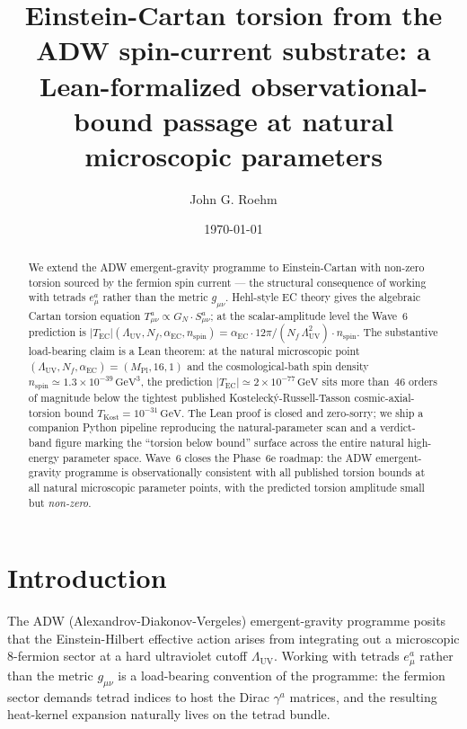 \documentclass[twocolumn]{revtex4-2}
\newcommand{\Nf}{N_f}
\newcommand{\LambdaUV}{\Lambda_{\mathrm{UV}}}
\newcommand{\MPl}{M_{\mathrm{Pl}}}
\newcommand{\aEC}{\alpha_{\mathrm{EC}}}
\newcommand{\GN}{G_{N}}
\newcommand{\TEC}{T_{\mathrm{EC}}}
\newcommand{\nspin}{n_{\mathrm{spin}}}
\newcommand{\TKost}{T_{\mathrm{Kost}}}
\begin{document}
\title{Einstein-Cartan torsion from the ADW spin-current substrate:
  a Lean-formalized observational-bound passage at natural microscopic
  parameters}

\author{John G. Roehm}

\date{\today}

\begin{abstract}
We extend the ADW emergent-gravity programme to Einstein-Cartan with
non-zero torsion sourced by the fermion spin current --- the
structural consequence of working with tetrads $e^{a}_{\mu}$ rather
than the metric $g_{\mu\nu}$. Hehl-style EC theory gives the algebraic
Cartan torsion equation $T^{a}_{\mu\nu} \propto \GN\cdot S^{a}_{\mu\nu}$;
at the scalar-amplitude level the Wave~6 prediction is
$|\TEC|(\LambdaUV,\Nf,\aEC,\nspin)
   = \aEC\cdot 12\pi/(\Nf\,\LambdaUV^{2})\cdot\nspin$.
The substantive load-bearing claim is a Lean theorem: at the natural
microscopic point $(\LambdaUV,\Nf,\aEC) = (\MPl,16,1)$ and the
cosmological-bath spin density $\nspin \simeq 1.3\times 10^{-39}\,
\mathrm{GeV}^{3}$, the prediction $|\TEC| \simeq 2\times 10^{-77}\,
\mathrm{GeV}$ sits more than~46 orders of magnitude below the
tightest published Kostelecký-Russell-Tasson cosmic-axial-torsion
bound $\TKost = 10^{-31}\,\mathrm{GeV}$. The Lean proof is closed and
zero-sorry; we ship a companion Python pipeline reproducing the
natural-parameter scan and a verdict-band figure marking the
``torsion below bound'' surface across the entire natural high-energy
parameter space. Wave~6 closes the Phase~6e roadmap: the ADW
emergent-gravity programme is observationally consistent with all
published torsion bounds at all natural microscopic parameter points,
with the predicted torsion amplitude small but \emph{non-zero}.
\end{abstract}

\maketitle

\section{Introduction}

The ADW (Alexandrov-Diakonov-Vergeles) emergent-gravity programme
\cite{Sakharov1968,Adler1982,Diakonov2011,VladimirovDiakonov2012,Vergeles2025}
posits that the Einstein-Hilbert effective action arises from
integrating out a microscopic 8-fermion sector at a hard ultraviolet
cutoff $\LambdaUV$. Working with tetrads $e^{a}_{\mu}$ rather than the
metric $g_{\mu\nu}$ is a load-bearing convention of the programme:
the fermion sector demands tetrad indices to host the Dirac
$\gamma^{a}$ matrices, and the resulting heat-kernel expansion
\cite{Vassilevich2003,Roehm2026Wave1} naturally lives on the
tetrad bundle.
\end{document}
